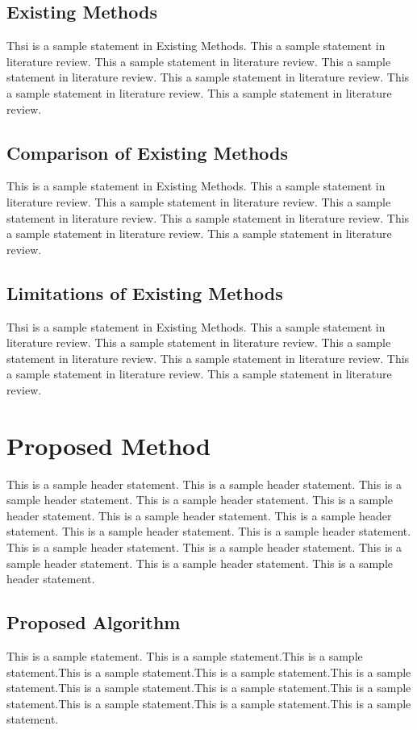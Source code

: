 \documentclass[12pt]{report}
\begin{document}
\section{Existing Methods}
Thsi is a sample statement in Existing Methods. This a sample statement in literature review. This a sample statement in literature review. This a sample statement in literature review. This a sample statement in literature review. This a sample statement in literature review. This a sample statement in literature review. 

\section{Comparison of Existing Methods}
This is a sample statement in Existing Methods. This a sample statement in literature review. This a sample statement in literature review. This a sample statement in literature review. This a sample statement in literature review. This a sample statement in literature review. This a sample statement in literature review. 

\section{Limitations of Existing Methods}
Thsi is a sample statement in Existing Methods. This a sample statement in literature review. This a sample statement in literature review. This a sample statement in literature review. This a sample statement in literature review. This a sample statement in literature review. This a sample statement in literature review. 

\chapter{Proposed Method}
This is a sample header statement. This is a sample header statement. This is a sample header statement. This is a sample header statement. This is a sample header statement. This is a sample header statement. This is a sample header statement. This is a sample header statement. This is a sample header statement. This is a sample header statement. This is a sample header statement. This is a sample header statement. This is a sample header statement. This is a sample header statement. 

\section{Proposed Algorithm}
This is a sample statement. This is a sample statement.This is a sample statement.This is a sample statement.This is a sample statement.This is a sample statement.This is a sample statement.This is a sample statement.This is a sample statement.This is a sample statement.This is a sample statement.This is a sample statement.
\end{document}
